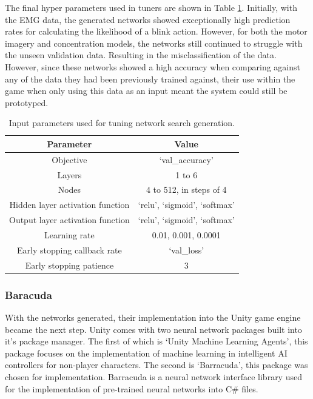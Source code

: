 \documentclass[11pt, a4paper]{article}
\newcommand{\reftable}[1]{Table \ref{#1}}
\begin{document}
\pagebreak

The final hyper parameters used in tuners are shown in \reftable{tab:ffnn_:_search_parameters}. Initially, with the EMG data, the generated networks showed exceptionally high prediction rates for calculating the likelihood of a blink action. However, for both the motor imagery and concentration models, the networks still continued to struggle with the unseen validation data. Resulting in the misclassification of the data. However, since these networks showed a high accuracy when comparing against any of the data they had been previously trained against, their use within the game when only using this data as an input meant the system could still be prototyped.


\begin{table}[H]
	\centering
	\begin{tabular}{ |c|c| }
		\hline
		
		Parameter 								& Value 							\\	\hline \hline
		
		Objective 								& `val\_accuracy' 					\\ 	\hline
		Layers 									& 1 to 6 							\\ 	\hline
		Nodes 									& 4 to 512, in steps of 4 			\\  \hline
		Hidden layer activation function 		& `relu', `sigmoid', `softmax' 		\\	\hline
		Output layer activation function 		& `relu', `sigmoid', `softmax' 		\\	\hline
		Learning rate 							& 0.01, 0.001, 0.0001 				\\	\hline
		Early stopping callback rate			& `val\_loss' 						\\  \hline
		Early stopping patience					& 3 								\\	
		
		\hline		
	\end{tabular}
	\captionsetup{width=.8\linewidth}
	\caption{Input parameters used for tuning network search generation.}
	\label{tab:ffnn_:_search_parameters}
\end{table}


\subsubsection{Baracuda}
	
With the networks generated, their implementation into the Unity game engine became the next step. Unity comes with two neural network packages built into it's package manager. The first of which is `Unity Machine Learning Agents', this package focuses on the implementation of machine learning in intelligent AI controllers for non-player characters. The second is `Barracuda', this package was chosen for implementation. Barracuda is a neural network interface library used for the implementation of pre-trained neural networks into C\# files. 
\end{document}
